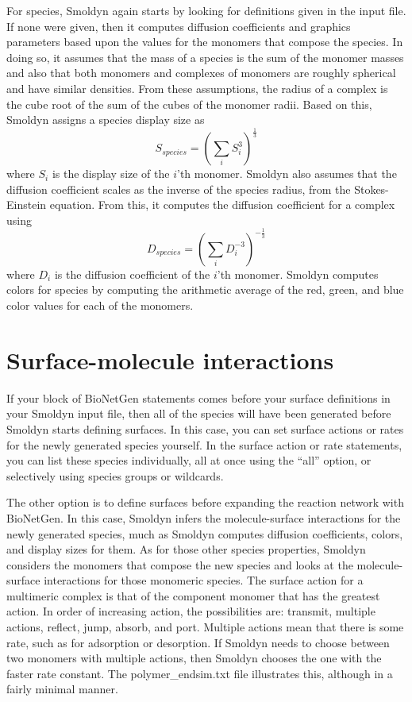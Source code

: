 \documentclass {book}
\begin{document}
For species, Smoldyn again starts by looking for definitions given in the input file. If none were given, then it computes diffusion coefficients and graphics parameters based upon the values for the monomers that compose the species. In doing so, it assumes that the mass of a species is the sum of the monomer masses and also that both monomers and complexes of monomers are roughly spherical and have similar densities. From these assumptions, the radius of a complex is the cube root of the sum of the cubes of the monomer radii. Based on this, Smoldyn assigns a species display size as
$$S_{species} = \left( \sum_i S_i^3 \right)^{\frac{1}{3}}$$
where $S_i$ is the display size of the $i$'th monomer. Smoldyn also assumes that the diffusion coefficient scales as the inverse of the species radius, from the Stokes-Einstein equation. From this, it computes the diffusion coefficient for a complex using
$$D_{species} = \left( \sum_i D_i^{-3} \right)^{-\frac{1}{3}}$$
where $D_i$ is the diffusion coefficient of the $i$'th monomer. Smoldyn computes colors for species by computing the arithmetic average of the red, green, and blue color values for each of the monomers.

\section{Surface-molecule interactions}

If your block of BioNetGen statements comes before your surface definitions in your Smoldyn input file, then all of the species will have been generated before Smoldyn starts defining surfaces. In this case, you can set surface actions or rates for the newly generated species yourself. In the surface action or rate statements, you can list these species individually, all at once using the ``all'' option, or selectively using species groups or wildcards.

The other option is to define surfaces before expanding the reaction network with BioNetGen. In this case, Smoldyn infers the molecule-surface interactions for the newly generated species, much as Smoldyn computes diffusion coefficients, colors, and display sizes for them. As for those other species properties, Smoldyn considers the monomers that compose the new species and looks at the molecule-surface interactions for those monomeric species. The surface action for a multimeric complex is that of the component monomer that has the greatest action. In order of increasing action, the possibilities are: transmit, multiple actions, reflect, jump, absorb, and port. Multiple actions mean that there is some rate, such as for adsorption or desorption. If Smoldyn needs to choose between two monomers with multiple actions, then Smoldyn chooses the one with the faster rate constant. The polymer\_endsim.txt file illustrates this, although in a fairly minimal manner.
\end{document}
